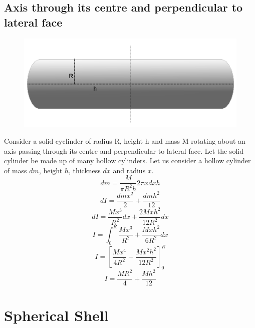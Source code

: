 \documentclass{article}
\begin{document}
\subsection{Axis through its centre and perpendicular to lateral face}
\begin{figure}[h!]
  \centering
  \includegraphics[scale=0.5]{cylinder2.png}
\end{figure}
Consider a solid cyclinder of radius R, height h and mass M rotating about an axis passing through its centre and perpendicular to lateral face. Let the solid cylinder be made up of many hollow cylinders.
Let us consider a hollow cylinder of mass $dm$, height $h$, thickness $dx$ and radius $x$.
$$dm = \frac{M}{\pi R^2 h}2\pi xdxh$$
$$dI = \frac{dmx^2}{2} + \frac{dmh^2}{12}$$
$$dI = \frac{Mx^3}{R^2} dx + \frac{2Mxh^2}{12R^2} dx$$
$$I = \int_0^R \frac{Mx^3}{R^2} + \frac{Mxh^2}{6R^2} dx$$
$$I = \left[ \frac{Mx^4}{4R^2} + \frac{Mx^2h^2}{12R^2} \right]_0^R$$
$$\boxed{I = \frac{MR^2}{4} + \frac{Mh^2}{12}}$$

\section{Spherical Shell}
\end{document}
